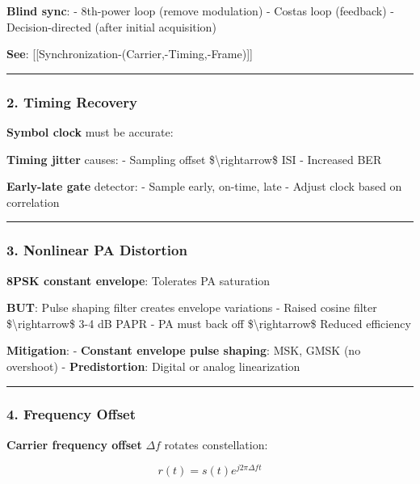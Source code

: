 \textbf{Blind sync}: - 8th-power loop (remove modulation) - Costas loop
(feedback) - Decision-directed (after initial acquisition)

\textbf{See}: {[}{[}Synchronization-(Carrier,-Timing,-Frame){]}{]}

\begin{center}\rule{0.5\linewidth}{0.5pt}\end{center}

\subsubsection{2. Timing Recovery}\label{timing-recovery}

\textbf{Symbol clock} must be accurate:

\textbf{Timing jitter} causes: - Sampling offset
\$\textbackslash rightarrow\$ ISI - Increased BER

\textbf{Early-late gate} detector: - Sample early, on-time, late -
Adjust clock based on correlation

\begin{center}\rule{0.5\linewidth}{0.5pt}\end{center}

\subsubsection{3. Nonlinear PA
Distortion}\label{nonlinear-pa-distortion}

\textbf{8PSK constant envelope}: Tolerates PA saturation

\textbf{BUT}: Pulse shaping filter creates envelope variations - Raised
cosine filter \$\textbackslash rightarrow\$ 3-4 dB PAPR - PA must back
off \$\textbackslash rightarrow\$ Reduced efficiency

\textbf{Mitigation}: - \textbf{Constant envelope pulse shaping}: MSK,
GMSK (no overshoot) - \textbf{Predistortion}: Digital or analog
linearization

\begin{center}\rule{0.5\linewidth}{0.5pt}\end{center}

\subsubsection{4. Frequency Offset}\label{frequency-offset}

\textbf{Carrier frequency offset} \(\Delta f\) rotates constellation:

\[
r(t) = s(t) e^{j2\pi \Delta f t}
\]


